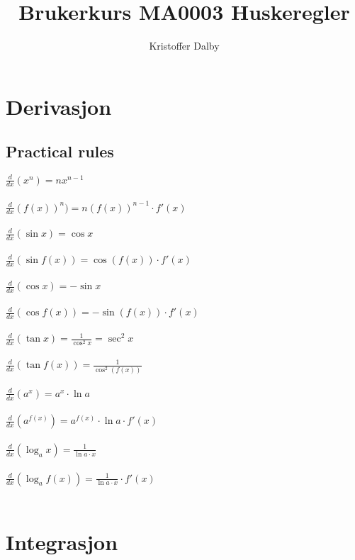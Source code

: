 \documentclass[a4paper, 10pt]{article}
\title{Brukerkurs MA0003 Huskeregler}
\author{Kristoffer Dalby}
\date{}
\begin{document}
\maketitle

\thispagestyle{empty}
\newpage
{}
\setcounter{page}{1}

\section{Derivasjon}

\subsection{Practical rules}
$\frac{d}{dx} (x^n)= nx^{n-1}$\\\\
$\frac{d}{dx} (f(x))^n) = n(f(x))^{n-1} \cdot f'(x)$\\\\
$\frac{d}{dx} (\sin x) = \cos x $\\\\
$\frac{d}{dx} (\sin f(x)) = \cos(f(x)) \cdot f'(x) $\\\\
$\frac{d}{dx} (\cos x) = -\sin x $\\\\
$\frac{d}{dx} (\cos f(x)) = -\sin(f(x)) \cdot f'(x) $\\\\
$\frac{d}{dx} (\tan x) = \frac{1}{\cos^2x} = \sec^2 x$\\\\
$\frac{d}{dx} (\tan f(x)) = \frac{1}{\cos^2(f(x))}$\\\\
$\frac{d}{dx} (a^x) = a^x \cdot \ln a$\\\\
$\frac{d}{dx} (a^{f(x)}) = a^{f(x)} \cdot \ln a \cdot f'(x)$\\\\
$\frac{d}{dx} (\log_ax) = \frac{1}{\ln a \cdot x} $\\\\
$\frac{d}{dx} (\log_af(x)) = \frac{1}{\ln a \cdot x} \cdot f'(x) $\\\\


\section{Integrasjon}
\end{document}
